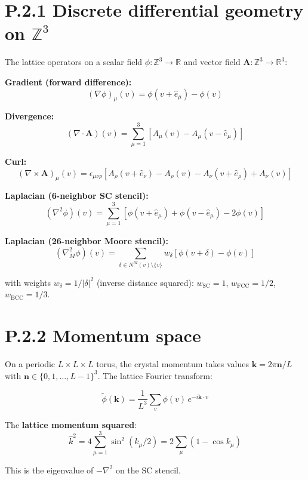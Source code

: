 \documentclass[
  11pt,
  letterpaper,
  twoside,
  openright]{book}
\begin{document}
\section{\texorpdfstring{P.2.1 Discrete differential geometry on
\(\mathbb{Z}^3\)}{P.2.1 Discrete differential geometry on \textbackslash mathbb\{Z\}\^{}3}}\label{p.2.1-discrete-differential-geometry-on-mathbbz3}

The lattice operators on a scalar field
\(\phi : \mathbb{Z}^3 \to \mathbb{R}\) and vector field
\(\mathbf{A} : \mathbb{Z}^3 \to \mathbb{R}^3\):

\textbf{Gradient (forward difference):} \[
(\nabla \phi)_\mu(v) = \phi(v + \hat{e}_\mu) - \phi(v)
\tag{P.1}
\]

\textbf{Divergence:} \[
(\nabla \cdot \mathbf{A})(v) = \sum_{\mu=1}^3 \left[ A_\mu(v) - A_\mu(v - \hat{e}_\mu) \right]
\tag{P.2}
\]

\textbf{Curl:} \[
(\nabla \times \mathbf{A})_\mu(v) = \epsilon_{\mu\nu\rho} \left[ A_\rho(v + \hat{e}_\nu) - A_\rho(v) - A_\nu(v + \hat{e}_\rho) + A_\nu(v) \right]
\tag{P.3}
\]

\textbf{Laplacian (6-neighbor SC stencil):} \[
(\nabla^2 \phi)(v) = \sum_{\mu=1}^3 \left[ \phi(v + \hat{e}_\mu) + \phi(v - \hat{e}_\mu) - 2\phi(v) \right]
\tag{P.4}
\]

\textbf{Laplacian (26-neighbor Moore stencil):} \[
(\nabla^2_M \phi)(v) = \sum_{\delta \in N^M(v) \setminus \{v\}} w_\delta \left[ \phi(v + \delta) - \phi(v) \right]
\tag{P.5}
\]

with weights \(w_\delta = 1/|\delta|^2\) (inverse distance squared):
\(w_{\text{SC}} = 1\), \(w_{\text{FCC}} = 1/2\),
\(w_{\text{BCC}} = 1/3\).

\section{P.2.2 Momentum space}\label{p.2.2-momentum-space}

On a periodic \(L \times L \times L\) torus, the crystal momentum takes
values \(\mathbf{k} = 2\pi \mathbf{n}/L\) with
\(\mathbf{n} \in \{0, 1, \ldots, L-1\}^3\). The lattice Fourier
transform:

\[
\tilde{\phi}(\mathbf{k}) = \frac{1}{L^3} \sum_{v} \phi(v) \, e^{-i\mathbf{k} \cdot v}
\tag{P.6}
\]

The \textbf{lattice momentum squared}: \[
\hat{k}^2 = 4 \sum_{\mu=1}^3 \sin^2(k_\mu/2) = 2\sum_\mu (1 - \cos k_\mu)
\tag{P.7}
\]

This is the eigenvalue of \(-\nabla^2\) on the SC stencil.
\end{document}
